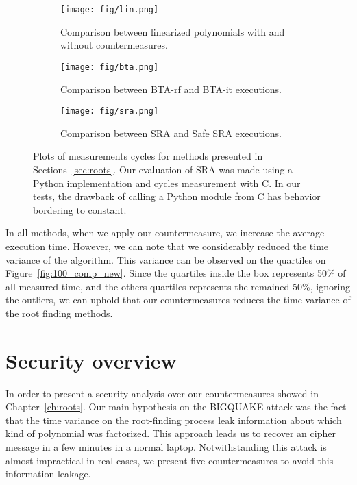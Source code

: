 \begin{figure}[!ht]
\begin{subfigure}{0.5\textwidth}
  \centering
  \texttt{[image: fig/lin.png]}
  \caption{Comparison between linearized polynomials with and without countermeasures.}
  \label{fig:slin}
\end{subfigure}
\begin{subfigure}{0.5\textwidth}
  \centering
  \texttt{[image: fig/bta.png]}
  \caption{Comparison between BTA-rf and BTA-it executions.}
  \label{fig:sbta}
\end{subfigure}
\begin{subfigure}{0.48\textwidth}
  \centering
  \texttt{[image: fig/sra.png]}
  \caption{Comparison between SRA and Safe SRA executions.}
  \label{fig:ssra}
\end{subfigure}%
\caption{Plots of measurements cycles for methods presented in Sections~\ref{sec:roots}. Our evaluation of SRA was made using a Python implementation and cycles measurement with C. In our tests, the drawback of calling a Python module from C has behavior bordering to constant.}
\label{fig:55-60-100}
\end{figure}



In all methods, when we apply our countermeasure, we increase the average execution time. However, we can note that we considerably reduced the time variance of the algorithm. This variance can be observed on the quartiles on Figure~\ref{fig:100_comp_new}. Since the quartiles inside the box represents 50\% of all measured time, and the others quartiles represents the remained 50\%, ignoring the outliers, we can uphold that our countermeasures reduces the time variance of the root finding methods. 

\section{Security overview}
In order to present a security analysis over our countermeasures showed in Chapter~\ref{ch:roots}. Our main hypothesis on the BIGQUAKE attack was the fact that the time variance on the root-finding process leak information about which kind of polynomial was factorized. This approach leads us to recover an cipher message in a few minutes in a normal laptop. Notwithstanding this attack is almost impractical in real cases, we present five countermeasures to avoid this information leakage.

